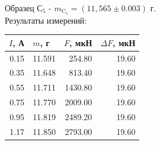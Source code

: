 \documentclass[a4paper,12pt]{extarticle}
\begin{document}
\begin{enumerate}
\begin{tabular}{|r|r|r|r|}
    \end{tabular} \\ \\ \\
    Образец С$_5$ - $m_{\text{C$_5$}} = (11,565\pm0.003)$ г. \\
    Результаты измерений: 
    \begin{tabular}{|r|r|r|r|}
    \hline
    \multicolumn{1}{|l|}{$I$, А} & \multicolumn{1}{l|}{$m$, г} & \multicolumn{1}{l|}{$F$, мкН} & \multicolumn{1}{l|}{$\Delta F$, мкН} \\ \hline
    0.15 & 11.591 & 254.80  & 19.60 \\ \hline
    0.35 & 11.648 & 813.40  & 19.60 \\ \hline
    0.55 & 11.711 & 1430.80 & 19.60 \\ \hline
    0.75 & 11.770 & 2009.00 & 19.60 \\ \hline
    0.95 & 11.819 & 2489.20 & 19.60 \\ \hline
    1.17 & 11.850 & 2793.00 & 19.60 \\ \hline
    \end{tabular} \\ \\ \\

\end{enumerate}
\end{document}
